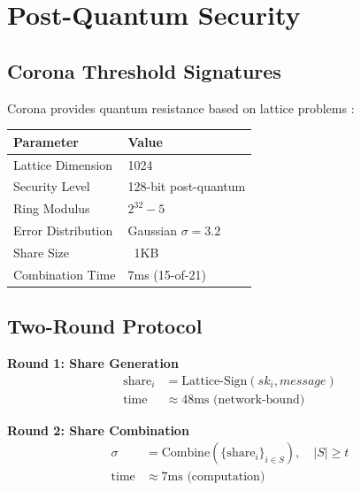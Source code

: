 \section{Post-Quantum Security}


\subsection{Corona Threshold Signatures}

Corona provides quantum resistance based on lattice problems \cite{corona}:

\begin{table}[h]
\centering
\begin{tabular}{@{}ll@{}}
\toprule
\textbf{Parameter} & \textbf{Value} \\
\midrule
Lattice Dimension & 1024 \\
Security Level & 128-bit post-quantum \\
Ring Modulus & $2^{32} - 5$ \\
Error Distribution & Gaussian $\sigma = 3.2$ \\
Share Size & ~1KB \\
Combination Time & 7ms (15-of-21) \\
\bottomrule
\end{tabular}

\label{tab:corona-params}
\end{table}

\subsection{Two-Round Protocol}

\textbf{Round 1: Share Generation}
\begin{align}
\text{share}_i &= \text{Lattice-Sign}(sk_i, message) \\
\text{time} &\approx 48\text{ms (network-bound)}
\end{align}

\textbf{Round 2: Share Combination}
\begin{align}
\sigma &= \text{Combine}(\{\text{share}_i\}_{i \in S}), \quad |S| \geq t \\
\text{time} &\approx 7\text{ms (computation)}
\end{align}

